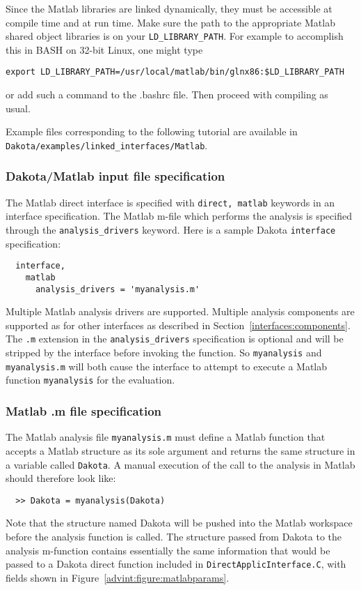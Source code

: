 Since the Matlab libraries are linked dynamically, they must be
accessible at compile time and at run time. Make sure the path to the
appropriate Matlab shared object libraries is on your 
{\tt LD\_LIBRARY\_PATH}. For example to accomplish this in BASH on
32-bit Linux, one might type
\begin{verbatim}
export LD_LIBRARY_PATH=/usr/local/matlab/bin/glnx86:$LD_LIBRARY_PATH
\end{verbatim} %
or add such a command to the .bashrc file. Then proceed with
compiling as usual.

Example files corresponding to the following tutorial are available in \\ 
{\tt Dakota/examples/linked\_interfaces/Matlab}.

\subsubsection{Dakota/Matlab input file specification}

The Matlab direct interface is specified with {\tt direct, matlab}
keywords in an interface specification. The Matlab m-file which
performs the analysis is specified through the {\tt analysis\_drivers}
keyword. Here is a sample Dakota {\tt interface} specification:
\begin{small}
\begin{verbatim}
  interface,
    matlab
      analysis_drivers = 'myanalysis.m'
\end{verbatim} 
\end{small}

Multiple Matlab analysis drivers are supported. Multiple analysis
components are supported as for other interfaces as described in
Section~\ref{interfaces:components}. The {\tt .m} extension in the
{\tt analysis\_drivers} specification is optional and will be stripped
by the interface before invoking the function. So {\tt myanalysis}
and {\tt myanalysis.m} will both cause the interface to attempt to
execute a Matlab function {\tt myanalysis} for the evaluation.

\subsubsection{Matlab .m file specification}

The Matlab analysis file {\tt myanalysis.m} must define a Matlab
function that accepts a Matlab structure as its sole argument and
returns the same structure in a variable called {\tt Dakota}. A
manual execution of the call to the analysis in Matlab should
therefore look like:
\begin{small}
\begin{verbatim}
  >> Dakota = myanalysis(Dakota)
\end{verbatim} 
\end{small}
Note that the structure named Dakota will be pushed into the Matlab
workspace before the analysis function is called. The structure
passed from Dakota to the analysis m-function contains essentially the
same information that would be passed to a Dakota direct function
included in {\tt DirectApplicInterface.C}, with fields shown in
Figure~\ref{advint:figure:matlabparams}.

